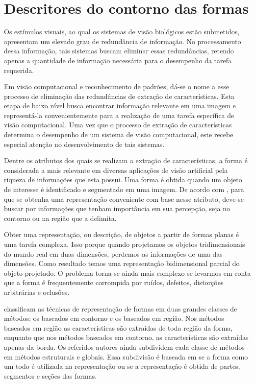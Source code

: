 \section{\label{chap:contour}Descritores do contorno das formas}

Os estímulos visuais, ao qual os sistemas de visão biológicos estão submetidos, apresentam um elevado grau de redundância de informação. No processamento dessa informação, tais sistemas buscam eliminar essas redundâncias, retendo apenas a quantidade de informação necessária para o desempenho da tarefa requerida.  

Em visão computacional e reconhecimento de padrões, dá-se o nome a esse processo de eliminação das redundâncias de extração de características. Esta etapa de baixo nível busca encontrar informação relevante em uma imagem e representá-la convenientemente para a realização de uma tarefa específica de visão computacional. Uma vez que o processo de extração de características determina o desempenho de um sistema de visão computacional, este recebe especial atenção no desenvolvimento de tais sistemas.

Dentre os atributos dos quais se realizam a extração de características, a forma é considerada a mais relevante em diversas aplicações de visão artificial pela riqueza de informações que esta possui. Uma forma é obtida quando um objeto de interesse é identificado e segmentado em uma imagem. 
 De acordo com , para que se obtenha uma representação conveniente com base nesse atributo, deve-se buscar por informações que tenham importância em sua percepção, seja no contorno ou na região que a delimita. 

Obter uma representação, ou descrição, de objetos a partir de formas planas é uma tarefa complexa. Isso porque quando projetamos os objetos tridimensionais do mundo real em duas dimensões, perdemos as informações de uma das dimensões. Como resultado temos uma representação bidimensional parcial do objeto projetado. O problema torna-se ainda mais complexo se levarmos em conta que a forma é frequentemente corrompida por ruídos, defeitos, distorções arbitrárias e oclusões.

 classificam as técnicas de representação de formas em duas grandes classes de métodos: os baseados em contorno e os baseados em região. Nos métodos baseados em região as características são extraídas de toda região da forma, enquanto que nos métodos baseados em contorno, as características são extraídas apenas da borda. Os referidos autores ainda subdividem cada classe de métodos em métodos estruturais e globais. Essa subdivisão é baseada em se a forma como um todo é utilizada na representação ou se a representação é obtida de partes, segmentos e seções das formas. 

